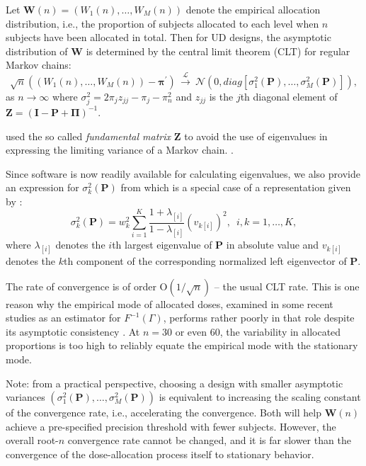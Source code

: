 Let $\mathbf{W}(n)=\left(W_1(n),\ldots ,W_M(n)\right)$ denote the empirical allocation distribution, i.e., the proportion of subjects allocated to each level when $n$ subjects have been allocated in total. Then for UD designs, the asymptotic distribution of $\mathbf{W}$ is determined by the central limit theorem (CLT) for regular Markov chains:
%
\begin{equation}\label{eq:CLT}
\sqrt{n}\left(\left(W_1(n),\ldots, W_M(n)\right)-\boldsymbol{\pi}^\prime\right)\,
\stackrel{\mathcal{L}}\longrightarrow
\ \mathcal{N}\left(0,diag\left[\sigma_1^2(\mathbf{P})
,\ldots ,\sigma_M^2(\mathbf{P})\right] \right),
\end{equation}
as $n\rightarrow \infty$ where $\sigma^2_j=2\pi_jz_{jj}-\pi_j-\pi_n^2$ and $z_{jj}$ is the $j$th diagonal element of  $\mathbf{Z}=(\mathbf{I}-\mathbf{P}+\boldsymbol{\Pi})^{-1}$.

\cite{Frec:1938} used the so called \textit{fundamental
matrix} $\mathbf{Z}$ to avoid the use of
eigenvalues in expressing the limiting variance of a Markov chain.
 \citep[see also Chapter 11, pg 464]{Grin:Snel:Intr:1997}.

 Since software is now readily available for calculating eigenvalues, we also provide
 an
expression for $\sigma_k^2(\mathbf{P})$ from
 \cite{Bort:Giov:Upan:2005}  which is a special case of a representation given by
 \cite{Pesk:opti:1973}:
\begin{equation}\label{eq:MCrxvar}
\sigma_k^2(\mathbf{P})=w_k^2\sum_{i=1}^K\frac{1+\lambda_{[i]}}{1-\lambda_{[i]}}
\left(v_{k[i]}\right)^2,\,\,\,i,k=1,\ldots,K,
\end{equation}
where $\lambda_{[i]}$ denotes the $i$th largest eigenvalue of {$\mathbf
P$} in absolute value and $v_{k[i]}$ denotes the $k$th component of
the corresponding normalized left eigenvector of ${\mathbf{P}}$.


%
The rate of convergence is of order $\mathrm{O}\left(1/\sqrt{n}\right)$ -- the usual CLT rate. This is one reason why the empirical mode of allocated doses, examined in some recent studies as an estimator for $F^{-1}(\Gamma)$, performs rather poorly in that role despite its asymptotic consistency \citep{Giov:Pint:Pint:prop:1998}. At $n=30$ or even $60$, the variability in allocated proportions is too high to reliably equate the empirical mode with the stationary mode.

Note: from a practical perspective, choosing a design with smaller asymptotic variances $\left(\sigma_1^2(\mathbf{P}),\ldots,\sigma_M^2(\mathbf{P})\right)$ is equivalent to increasing the scaling constant of the convergence rate, i.e., accelerating the convergence. Both will help $\mathbf{W}(n)$ achieve a pre-specified precision threshold with fewer subjects. However, the overall root-$n$ convergence rate cannot be changed, and it is far slower than the convergence of the dose-allocation process itself to stationary behavior.

